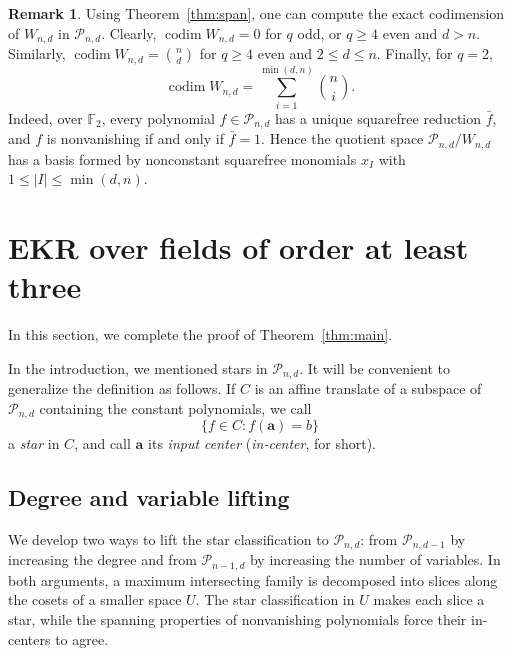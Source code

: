 \documentclass[12pt,reqno]{amsart}
\theoremstyle{definition}
\newtheorem{rem}[thm]{Remark}
\newcommand{\cP}{\mathcal P}
\begin{document}
\begin{rem}
Using Theorem~\ref{thm:span}, one can compute the exact codimension of $W_{n,d}$ in $\cP_{n, d}$. Clearly, $\operatorname{codim}  W_{n,d}=0$ for $q$ odd, or $q\ge 4$ even and $d>n$. Similarly, $\operatorname{codim} W_{n,d}=\binom{n}{d}$ for $q\geq 4$ even and $2\leq d\leq n$. Finally, for $q=2$,
\[
\operatorname{codim} W_{n,d} = \displaystyle \sum_{i=1}^{\min(d,n)} \binom{n}{i}.
\]
Indeed, over $\mathbb F_2$, every polynomial $f\in\cP_{n,d}$ has a unique squarefree reduction $\bar f$, and $f$ is nonvanishing if and only if $\bar f=1$. Hence the quotient space $\cP_{n,d}/W_{n,d}$ has a basis formed by nonconstant squarefree monomials $x_I$ with $1\le |I|\le \min(d,n)$. 
\end{rem}

\section{EKR over fields of order at least three}
\label{sec:qge3-pairwise}

In this section, we complete the proof of Theorem~\ref{thm:main}. 

In the introduction, we mentioned stars in $\cP_{n,d}$. It will be convenient to generalize the definition as follows. If $C$ is an affine translate of a subspace of $\cP_{n,d}$ containing the constant polynomials, we call
\[
  \{f\in C:f(\mathbf a)=b\}
\]
a \emph{star} in $C$, and call $\mathbf a$ its \emph{input center}
(\emph{in-center}, for short).

\subsection{Degree and variable lifting} \label{subsec:lifting}

We develop two ways to lift the star classification to $\cP_{n,d}$:
from $\cP_{n,d-1}$ by increasing the degree and from $\cP_{n-1,d}$ by increasing the number of variables. In both arguments, a maximum intersecting family is decomposed into slices along the cosets of a smaller space $U$. The star classification in $U$ makes each slice a star, while the spanning properties of nonvanishing polynomials force their in-centers to agree.
\end{document}
